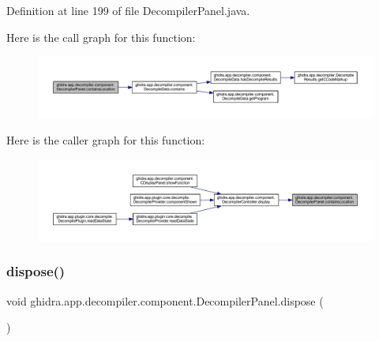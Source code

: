 Definition at line 199 of file Decompiler\+Panel.\+java.

Here is the call graph for this function\+:
\nopagebreak
\begin{figure}[H]
\begin{center}
\leavevmode
\includegraphics[width=350pt]{classghidra_1_1app_1_1decompiler_1_1component_1_1_decompiler_panel_abea619d9fb63b575bc784b16575dbd5b_cgraph}
\end{center}
\end{figure}
Here is the caller graph for this function\+:
\nopagebreak
\begin{figure}[H]
\begin{center}
\leavevmode
\includegraphics[width=350pt]{classghidra_1_1app_1_1decompiler_1_1component_1_1_decompiler_panel_abea619d9fb63b575bc784b16575dbd5b_icgraph}
\end{center}
\end{figure}
\mbox{\label{classghidra_1_1app_1_1decompiler_1_1component_1_1_decompiler_panel_a5a760268786c72bb8307a1cc11e1e3d0}} 
\subsubsection{\texorpdfstring{dispose()}{dispose()}}
{\footnotesize\ttfamily void ghidra.\+app.\+decompiler.\+component.\+Decompiler\+Panel.\+dispose (\begin{DoxyParamCaption}{ }\end{DoxyParamCaption})\hspace{0.3cm}{\ttfamily [inline]}}



